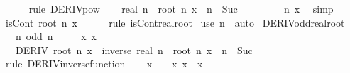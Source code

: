 \begin{isabellebody}
\ \ \ \ \isamarkupfalse%
\ {\isacharparenleft}{\kern0pt}rule\ DERIV{\isacharunderscore}{\kern0pt}pow{\isacharparenright}{\kern0pt}\isanewline
\ \ \isamarkupfalse%
\ {\isachardoublequoteopen}real\ n\ {\isacharasterisk}{\kern0pt}\ root\ n\ x\ {\isacharcircum}{\kern0pt}\ {\isacharparenleft}{\kern0pt}n\ {\isacharminus}{\kern0pt}\ Suc\ {}{\isacharparenright}{\kern0pt}\ {\isasymnoteq}\ {}{\isachardoublequoteclose}\isanewline
\ \ \ \ \isamarkupfalse%
\ n\ x\ \isamarkupfalse%
\ simp\isanewline
\ \ \isamarkupfalse%
\ {\isachardoublequoteopen}isCont\ {\isacharparenleft}{\kern0pt}root\ n{\isacharparenright}{\kern0pt}\ x{\isachardoublequoteclose}\isanewline
\ \ \ \ \isamarkupfalse%
\ {\isacharparenleft}{\kern0pt}rule\ isCont{\isacharunderscore}{\kern0pt}real{\isacharunderscore}{\kern0pt}root{\isacharparenright}{\kern0pt}\isanewline
{}\isamarkupfalse%
\ {\isacharparenleft}{\kern0pt}use\ n\ \ auto{\isacharparenright}{\kern0pt}%
\endisatagproof
{\isafoldproof}%
%
\isadelimproof
\isanewline
%
\endisadelimproof
\isanewline
{}\isamarkupfalse%
\ DERIV{\isacharunderscore}{\kern0pt}odd{\isacharunderscore}{\kern0pt}real{\isacharunderscore}{\kern0pt}root{\isacharcolon}{\kern0pt}\isanewline
\ \ \ n{\isacharcolon}{\kern0pt}\ {\isachardoublequoteopen}odd\ n{\isachardoublequoteclose}\isanewline
\ \ \ \ \ x{\isacharcolon}{\kern0pt}\ {\isachardoublequoteopen}x\ {\isasymnoteq}\ {}{\isachardoublequoteclose}\isanewline
\ \ \ {\isachardoublequoteopen}DERIV\ {\isacharparenleft}{\kern0pt}root\ n{\isacharparenright}{\kern0pt}\ x\ {\isacharcolon}{\kern0pt}{\isachargreater}{\kern0pt}\ inverse\ {\isacharparenleft}{\kern0pt}real\ n\ {\isacharasterisk}{\kern0pt}\ root\ n\ x\ {\isacharcircum}{\kern0pt}\ {\isacharparenleft}{\kern0pt}n\ {\isacharminus}{\kern0pt}\ Suc\ {}{\isacharparenright}{\kern0pt}{\isacharparenright}{\kern0pt}{\isachardoublequoteclose}\isanewline
%
\isadelimproof
%
\endisadelimproof
%
\isatagproof
{}\isamarkupfalse%
\ {\isacharparenleft}{\kern0pt}rule\ DERIV{\isacharunderscore}{\kern0pt}inverse{\isacharunderscore}{\kern0pt}function{\isacharparenright}{\kern0pt}\isanewline
\ \ \isamarkupfalse%
\ {\isachardoublequoteopen}x\ {\isacharminus}{\kern0pt}\ {}\ {\isacharless}{\kern0pt}\ x{\isachardoublequoteclose}\ {\isachardoublequoteopen}x\ {\isacharless}{\kern0pt}\ x\ {\isacharplus}{\kern0pt}\ {}{\isachardoublequoteclose}\isanewline

\end{isabellebody}
